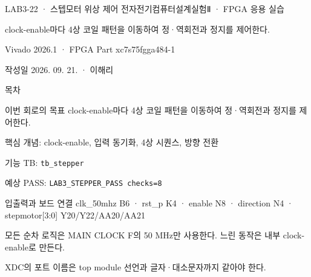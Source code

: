 

\renewcommand{\small}{\fontsize{8.7}{10.5}\selectfont}
\setlength{\leftmargini}{1.35em}

\begin{frame}{LAB3-22 · 스텝모터 위상 제어}
\small
전자전기컴퓨터설계실험Ⅱ · FPGA 응용 실습\par\vspace{0.28cm}
clock-enable마다 4상 코일 패턴을 이동하여 정·역회전과 정지를 제어한다.\par\vspace{0.28cm}
Vivado 2026.1 · FPGA Part xc7s75fgga484-1\par\vspace{0.28cm}
작성일 2026. 09. 21. · 이해리
\end{frame}

\begin{frame}[label=lab3-contents]{목차}
\small
{}\par\vspace{0.28cm}
\par\vspace{0.28cm}
\par\vspace{0.28cm}
\par\vspace{0.28cm}
\par\vspace{0.28cm}
\end{frame}

\begin{frame}[label=goal]{이번 회로의 목표}
\small
clock-enable마다 4상 코일 패턴을 이동하여 정·역회전과 정지를 제어한다.\par\vspace{0.28cm}
핵심 개념: clock-enable, 입력 동기화, 4상 시퀀스, 방향 전환\par\vspace{0.28cm}
기능 TB: \texttt{tb\_stepper}\par\vspace{0.18cm}
예상 PASS: \texttt{LAB3\_STEPPER\_PASS checks=8}
\end{frame}

\begin{frame}{입출력과 보드 연결}
\small
clk\_50mhz B6 · rst\_p K4 · enable N8 · direction N4 · stepmotor[3:0] Y20/Y22/AA20/AA21\par\vspace{0.32cm}
모든 순차 로직은 MAIN CLOCK F의 50 MHz만 사용한다. 느린 동작은 내부 clock-enable로 만든다.\par\vspace{0.28cm}
XDC의 포트 이름은 top module 선언과 글자·대소문자까지 같아야 한다.
\end{frame}

